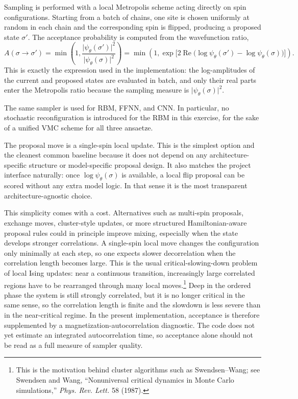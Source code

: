 \documentclass[11pt,a4paper]{article}
\begin{document}
Sampling is performed with a local Metropolis scheme acting directly on spin configurations. Starting from a batch of chains, one site is chosen uniformly at random in each chain and the corresponding spin is flipped, producing a proposed state $\sigma'$. The acceptance probability is computed from the wavefunction ratio,
\begin{equation}
    A(\sigma \rightarrow \sigma')
    =
    \min\!\left(
        1,
        \frac{\lvert \psi_\theta(\sigma') \rvert^2}{\lvert \psi_\theta(\sigma) \rvert^2}
    \right)
    =
    \min\!\left(
        1,
        \exp \bigl[ 2 \operatorname{Re} \bigl( \log \psi_\theta(\sigma') - \log \psi_\theta(\sigma) \bigr) \bigr]
    \right).
\end{equation}
This is exactly the expression used in the implementation: the log-amplitudes of the current and proposed states are evaluated in batch, and only their real parts enter the Metropolis ratio because the sampling measure is $\lvert \psi_\theta(\sigma) \rvert^2$.

The same sampler is used for RBM, FFNN, and CNN. In particular, no stochastic reconfiguration is introduced for the RBM in this exercise, for the sake of a unified VMC scheme for all three ansaetze.

The proposal move is a single-spin local update. This is the simplest option and the cleanest common baseline because it does not depend on any architecture-specific structure or model-specific proposal design. It also matches the project interface naturally: once $\log \psi_\theta(\sigma)$ is available, a local flip proposal can be scored without any extra model logic. In that sense it is the most transparent architecture-agnostic choice.

This simplicity comes with a cost. Alternatives such as multi-spin proposals, exchange moves, cluster-style updates, or more structured Hamiltonian-aware proposal rules could in principle improve mixing, especially when the state develops stronger correlations. A single-spin local move changes the configuration only minimally at each step, so one expects slower decorrelation when the correlation length becomes large. This is the usual critical-slowing-down problem of local Ising updates: near a continuous transition, increasingly large correlated regions have to be rearranged through many local moves.\footnote{This is the motivation behind cluster algorithms such as Swendsen--Wang; see Swendsen and Wang, ``Nonuniversal critical dynamics in Monte Carlo simulations,'' \emph{Phys. Rev. Lett.} 58 (1987).} Deep in the ordered phase the system is still strongly correlated, but it is no longer critical in the same sense, so the correlation length is finite and the slowdown is less severe than in the near-critical regime. In the present implementation, acceptance is therefore supplemented by a magnetization-autocorrelation diagnostic. The code does not yet estimate an integrated autocorrelation time, so acceptance alone should not be read as a full measure of sampler quality.
\end{document}
